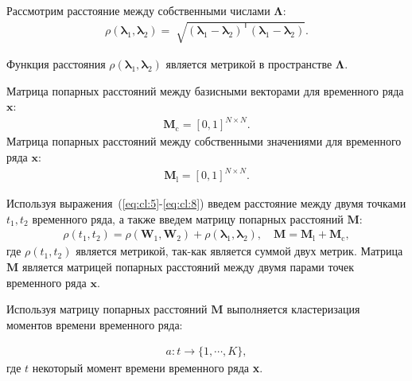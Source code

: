 \documentclass[12pt, twoside]{article}
\numberwithin{equation}{section}
\begin{document}
Рассмотрим расстояние между собственными числами $\bm{\Lambda}$:
\begin{equation}
\label{eq:cl:6}
\begin{aligned}
\rho\left(\bm{\lambda}_1, \bm{\lambda}_2\right) = \sqrt[]{\left(\bm{\lambda}_1 - \bm{\lambda}_2\right)^{\mathsf{T}}\left(\bm{\lambda}_1 - \bm{\lambda}_2\right)}.
\end{aligned}
\end{equation}

Функция расстояния $\rho\left(\bm{\lambda}_1, \bm{\lambda}_2\right)$ является метрикой в пространстве $\bm{\Lambda}$.

Матрица попарных расстояний между базисными векторами для временного ряда $\textbf{x}$:
\begin{equation}
\label{eq:cl:7}
\begin{aligned}
\textbf{M}_{\text{c}} = [0, 1]^{N\times N}.
\end{aligned}
\end{equation}
Матрица попарных расстояний между собственными значениями для временного ряда $\textbf{x}$:
\begin{equation}
\label{eq:cl:8}
\begin{aligned}
\textbf{M}_{\text{l}} = [0, 1]^{N\times N}.
\end{aligned}
\end{equation}

Используя выражения~(\ref{eq:cl:5}-\ref{eq:cl:8}) введем расстояние между двумя точками $t_1, t_2$ временного ряда, а также введем матрицу попарных расстояний $\textbf{M}$:
\begin{equation}
\label{eq:cl:9}
\begin{aligned}
\rho\left(t_1, t_2\right) = \rho\left(\textbf{W}_1, \textbf{W}_2\right) + \rho\left(\bm{\lambda}_1, \bm{\lambda}_2\right), \quad \textbf{M} = \textbf{M}_{\text{l}} + \textbf{M}_{\text{c}},
\end{aligned}
\end{equation}
где $\rho\left(t_1, t_2\right)$ является метрикой, так-как является суммой двух метрик. Матрица $\textbf{M}$ является матрицей попарных расстояний между двумя парами точек временного ряда $\textbf{x}$.

Используя матрицу попарных расстояний $\textbf{M}$ выполняется кластеризация моментов времени временного ряда:

\begin{equation}
\label{eq:cl:10}
\begin{aligned}
a : t \to \{1,\cdots, K\}, 
\end{aligned}
\end{equation}
где $t$ некоторый момент времени временного ряда \textbf{x}.
\end{document}
